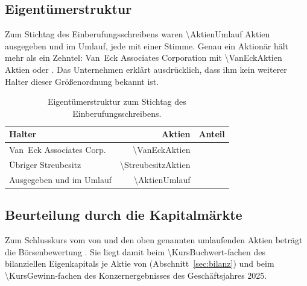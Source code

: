 \subsection{Eigent\"umerstruktur}
\label{sec:eigentuemer}

Zum Stichtag des Einberufungsschreibens waren \num{\AktienUmlauf} Aktien
ausgegeben und im Umlauf, jede mit einer Stimme.
Genau ein Aktion\"ar h\"alt mehr als ein Zehntel: Van~Eck Associates
Corporation mit \num{\VanEckAktien} Aktien oder
\Pct{\VanEckAnteil}. Das Unternehmen erkl\"art
ausdr\"ucklich, dass ihm kein weiterer Halter dieser Gr\"o{\ss}enordnung
bekannt ist.

\begin{table}[htbp]
\centering
\caption{Eigent\"umerstruktur zum Stichtag des Einberufungsschreibens.}
\label{tab:eigentuemer}
\begin{tabular}{lrr}
\toprule
Halter & Aktien & Anteil\\
\midrule
Van~Eck Associates Corp. & \num{\VanEckAktien} & \Pct{\VanEckAnteil}\\
\"Ubriger Streubesitz & \num{\StreubesitzAktien} & \Pct{\StreubesitzRest}\\
\midrule
Ausgegeben und im Umlauf & \num{\AktienUmlauf} & \Pct{\AnteilGesamt}\\
\bottomrule
\end{tabular}
\end{table}

\FloatBarrier


\subsection{Beurteilung durch die Kapitalm\"arkte}

Zum Schlusskurs vom \KursStand{} von \USDje{\Kurs} und den oben genannten
umlaufenden Aktien betr\"agt die B\"orsenbewertung
\MrdUSD{\Marktkapitalisierung}. Sie liegt damit beim
\num[round-mode=places,round-precision=2]{\KursBuchwert}-fachen des
bilanziellen Eigenkapitals je Aktie von \USDje{\BuchwertJeAktie}
(Abschnitt~\ref{sec:bilanz}) und beim
\num[round-mode=places,round-precision=1]{\KursGewinn}-fachen des
Konzernergebnisses des Gesch\"aftsjahres 2025.

